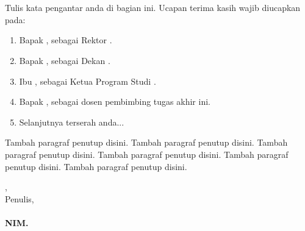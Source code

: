 \chapter*{\katapengantar}

Tulis kata pengantar anda di bagian ini. Ucapan terima kasih wajib diucapkan pada:
\begin{enumerate}
	\item Bapak \rektor, sebagai Rektor \universitas. 
	\item Bapak \dekan, sebagai Dekan \fakultas. 
	\item Ibu \kaprodi, sebagai Ketua Program Studi \prodi.
	\item Bapak \pembimbingI, sebagai dosen pembimbing tugas akhir ini.
	\item Selanjutnya terserah anda...
\end{enumerate}


Tambah paragraf penutup disini. Tambah paragraf penutup disini. Tambah paragraf penutup disini.
Tambah paragraf penutup disini. Tambah paragraf penutup disini. Tambah paragraf penutup disini.

\vspace*{0.1cm}

\begin{flushright}
\kota, \tglpersetujuan\\
Penulis,\\
\vspace{2cm}
\textbf{\underline{\peneliti}\\
NIM. \nim}

\end{flushright}